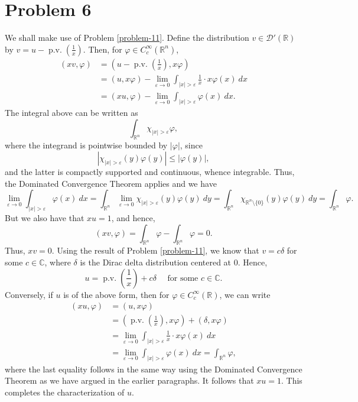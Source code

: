 \documentclass[10pt]{amsart}
\theoremstyle{thmstyle}
\theoremstyle{defstyle}
\newcommand{\R}{\mathbb{R}}
\newcommand{\bbC}{\mathbb{C}}
\renewcommand{\le}{\leqslant}
\newcommand{\pv}{\operatorname{p.v.}}
\begin{document}
\section{Problem 6}

We shall make use of Problem \ref{problem-11}. Define the distribution $v\in\mathscr D'(\R)$ by $v = u - \pv\left(\frac{1}{x}\right)$. Then, for $\varphi\in C_c^\infty(\R^n)$,
\begin{align*}
	(xv, \varphi) &= \left(u - \pv\left(\frac{1}{x}\right), x\varphi\right)\\
	&= (u, x\varphi) - \lim_{\varepsilon\to 0}\int_{|x| > \varepsilon}\frac{1}{x}\cdot x\varphi(x)~dx\\
	&= (xu, \varphi) - \lim_{\varepsilon\to 0}\int_{|x| > \varepsilon}\varphi(x)~dx.
\end{align*}
The integral above can be written as 
\begin{equation*}
	\int_{\R^n} \chi_{|x| > \varepsilon}\varphi,
\end{equation*}
where the integrand is pointwise bounded by $|\varphi|$, since 
\begin{equation*}
	|\chi_{|x| > \varepsilon}(y)\varphi(y)|\le |\varphi(y)|,
\end{equation*}
and the latter is compactly supported and continuous, whence integrable. Thus, the Dominated Convergence Theorem applies and we have 
\begin{equation*}
	\lim_{\varepsilon\to 0}\int_{|x| > \varepsilon}\varphi(x)~dx = \int_{\R^n}\lim_{\varepsilon\to 0}\chi_{|x| > \varepsilon}(y)\varphi(y)~dy = \int_{\R^n}\chi_{\R^n\setminus\{0\}}(y)\varphi(y)~dy  = \int_{\R^n}\varphi.
\end{equation*}
But we also have that $xu = 1$, and hence, 
\begin{equation*}
	(xv, \varphi) = \int_{\R^n}\varphi - \int_{\R^n}\varphi = 0.
\end{equation*}
Thus, $xv = 0$. Using the result of Problem \ref{problem-11}, we know that $v = c\delta$ for some $c\in\bbC$, where $\delta$ is the Dirac delta distribution centered at $0$. Hence, 
\begin{equation*}
	u = \pv\left(\frac{1}{x}\right) + c\delta\quad\text{ for some }c\in\bbC.
\end{equation*}
Conversely, if $u$ is of the above form, then for $\varphi\in C_c^\infty(\R)$, we can write 
\begin{align*}
	(xu, \varphi) &= (u, x\varphi)\\
	&= \left(\pv\left(\frac{1}{x}\right), x\varphi\right) + (\delta, x\varphi)\\
	&= \lim_{\varepsilon\to 0}\int_{|x| > \varepsilon}\frac{1}{x}\cdot x\varphi(x)~dx\\
	&= \lim_{\varepsilon\to 0}\int_{|x| > \varepsilon}\varphi(x)~dx = \int_{\R^n}\varphi,
\end{align*}
where the last equality follows in the same way using the Dominated Convergence Theorem as we have argued in the earlier paragraphs. It follows that $xu = 1$. This completes the characterization of $u$.
\end{document}
